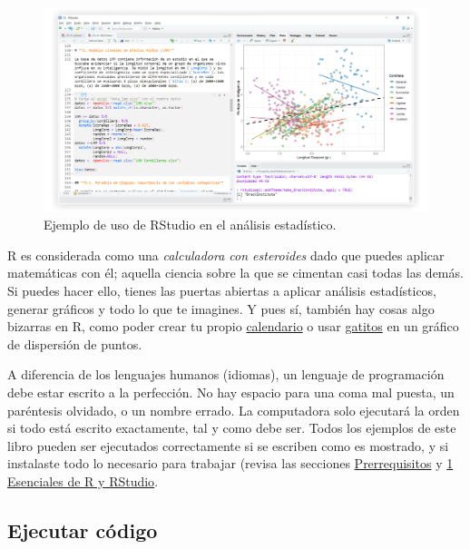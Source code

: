 \documentclass[
]{article}
\theoremstyle{definition}
\theoremstyle{definition}
\theoremstyle{definition}
\theoremstyle{definition}
\theoremstyle{remark}
\begin{document}
\begin{figure}

{\centering \includegraphics[width=1\linewidth]{figs/screenshots/tema BrackInstitute} 

}

\caption{Ejemplo de uso de RStudio en el análisis estadístico.}\label{fig:figura40}
\end{figure}

R es considerada como una \emph{calculadora con esteroides} dado que puedes aplicar matemáticas con él; aquella ciencia sobre la que se cimentan casi todas las demás. Si puedes hacer ello, tienes las puertas abiertas a aplicar análisis estadísticos, generar gráficos y todo lo que te imagines. Y pues sí, también hay cosas algo bizarras en R, como poder crear tu propio \href{https://r-coder.com/calendarios-r/}{calendario} o usar \href{https://github.com/R-CoderDotCom/ggcats}{gatitos} en un gráfico de dispersión de puntos.

A diferencia de los lenguajes humanos (idiomas), un lenguaje de programación debe estar escrito a la perfección. No hay espacio para una coma mal puesta, un paréntesis olvidado, o un nombre errado. La computadora solo ejecutará la orden si todo está escrito exactamente, tal y como debe ser. Todos los ejemplos de este libro pueden ser ejecutados correctamente si se escriben como es mostrado, y si instalaste todo lo necesario para trabajar (revisa las secciones \protect\hyperlink{prerrequisitos}{Prerrequisitos} y \protect\hyperlink{esencialesRRStudio}{1 Esenciales de R y RStudio}.

\hypertarget{ejecutar-cuxf3digo}{%
\subsection{Ejecutar código}\label{ejecutar-cuxf3digo}}
\end{document}
